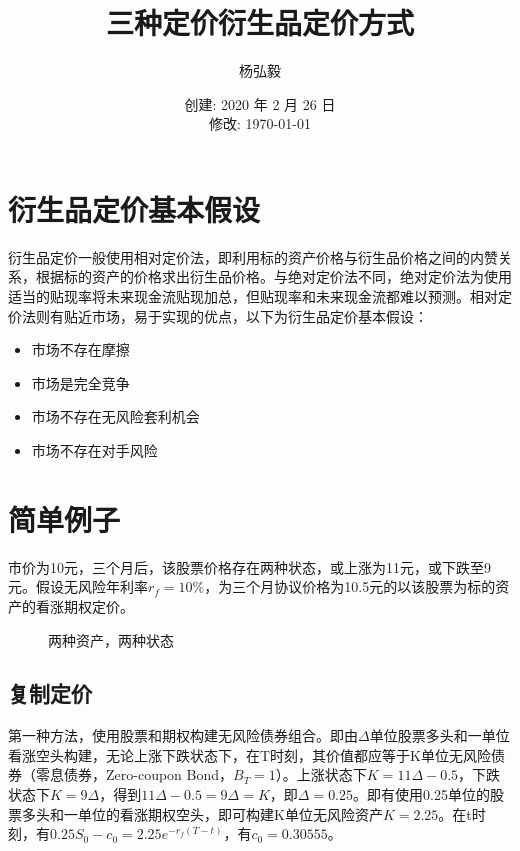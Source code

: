 \documentclass[11pt]{article}
\title{三种定价衍生品定价方式}
\author{杨弘毅}
\date{创建: 2020 年 2 月 26 日 \\修改: \today}
\begin{document}
\maketitle

\section{衍生品定价基本假设}
衍生品定价一般使用相对定价法，即利用标的资产价格与衍生品价格之间的内赞关系，根据标的资产的价格求出衍生品价格。与绝对定价法不同，绝对定价法为使用适当的贴现率将未来现金流贴现加总，但贴现率和未来现金流都难以预测。相对定价法则有贴近市场，易于实现的优点，以下为衍生品定价基本假设：
\begin{itemize}
  \item 市场不存在摩擦
  \item 市场是完全竞争
  \item 市场不存在无风险套利机会
  \item 市场不存在对手风险
\end{itemize}

\section{简单例子}
市价为10元，三个月后，该股票价格存在两种状态，或上涨为11元，或下跌至9元。假设无风险年利率$r_f=10\%$，为三个月协议价格为10.5元的以该股票为标的资产的看涨期权定价。
\begin{figure}[!ht]
  \centering
  \caption{两种资产，两种状态} \label{fig:M1}
\end{figure}

\subsection{复制定价}
第一种方法，使用股票和期权构建无风险债券组合。即由$\Delta$单位股票多头和一单位看涨空头构建，无论上涨下跌状态下，在T时刻，其价值都应等于K单位无风险债券（零息债券，Zero-coupon Bond，$B_T=1$）。上涨状态下$K=11\Delta-0.5$，下跌状态下$K=9\Delta$，得到$11\Delta-0.5=9\Delta=K$，即$\Delta=0.25$。即有使用0.25单位的股票多头和一单位的看涨期权空头，即可构建K单位无风险资产$K=2.25$。在t时刻，有$0.25S_0 - c_0=2.25e^{-r_f(T-t)}$，有$c_0=0.30555$。
\end{document}
